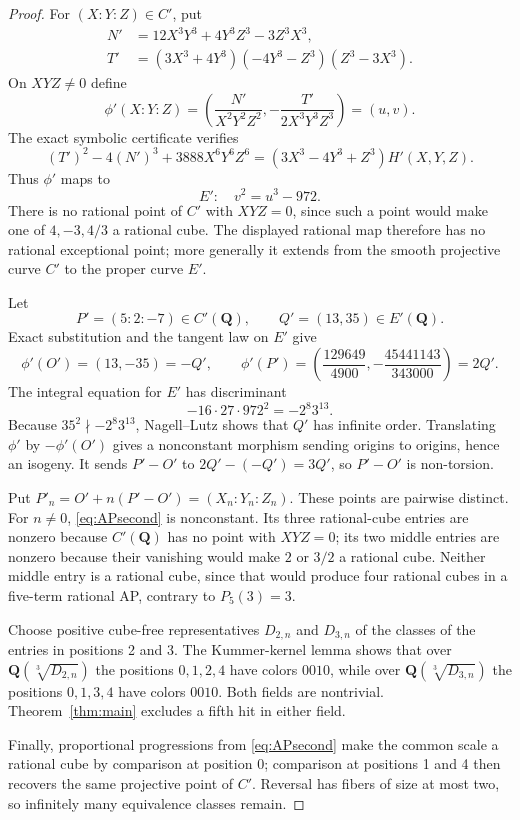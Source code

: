 \documentclass[10pt]{article}
\newcommand{\Q}{\mathbf Q}
\begin{document}
\begin{proof}
For $(X:Y:Z)\in C'$, put
\[
\begin{aligned}
 N'&=12X^3Y^3+4Y^3Z^3-3Z^3X^3,\\
 T'&=(3X^3+4Y^3)(-4Y^3-Z^3)(Z^3-3X^3).
\end{aligned}
\]
On $XYZ\ne0$ define
\[
 \phi'(X:Y:Z)=
 \left(\frac{N'}{X^2Y^2Z^2},
       -\frac{T'}{2X^3Y^3Z^3}\right)=(u,v).
\]
The exact symbolic certificate verifies
\[
 (T')^2-4(N')^3+3888X^6Y^6Z^6
 =(3X^3-4Y^3+Z^3)H'(X,Y,Z).
\]
Thus $\phi'$ maps to
\[
 E':\quad v^2=u^3-972.
\]
There is no rational point of $C'$ with $XYZ=0$, since such a point would
make one of $4,-3,4/3$ a rational cube.  The displayed rational map therefore
has no rational exceptional point; more generally it extends from the smooth
projective curve $C'$ to the proper curve $E'$.

Let
\[
 P'=(5:2:-7)\in C'(\Q),\qquad Q'=(13,35)\in E'(\Q).
\]
Exact substitution and the tangent law on $E'$ give
\[
 \phi'(O')=(13,-35)=-Q',\qquad
 \phi'(P')=
 \left(\frac{129649}{4900},-\frac{45441143}{343000}\right)=2Q'.
\]
The integral equation for $E'$ has discriminant
\[
 -16\cdot27\cdot972^2=-2^8 3^{13}.
\]
Because $35^2\nmid -2^8 3^{13}$, Nagell--Lutz shows that $Q'$ has infinite
order.  Translating $\phi'$ by $-\phi'(O')$ gives a nonconstant morphism
sending origins to origins, hence an isogeny.  It sends $P'-O'$ to
$2Q'-(-Q')=3Q'$, so $P'-O'$ is non-torsion.

Put $P'_n=O'+n(P'-O')=(X_n:Y_n:Z_n)$.  These points are pairwise distinct.
For $n\ne0$, \eqref{eq:APsecond} is nonconstant.  Its three rational-cube
entries are nonzero because $C'(\Q)$ has no point with $XYZ=0$; its two
middle entries are nonzero because their vanishing would make $2$ or $3/2$
a rational cube.  Neither middle entry is a rational cube, since that would
produce four rational cubes in a five-term rational AP, contrary to
$P_5(3)=3$.

Choose positive cube-free representatives $D_{2,n}$ and $D_{3,n}$ of the
classes of the entries in positions 2 and 3.  The Kummer-kernel lemma shows
that over $\Q(\sqrt[3]{D_{2,n}})$ the positions $0,1,2,4$ have colors
$0010$, while over $\Q(\sqrt[3]{D_{3,n}})$ the positions $0,1,3,4$ have
colors $0010$.  Both fields are nontrivial.  Theorem~\ref{thm:main} excludes
a fifth hit in either field.

Finally, proportional progressions from \eqref{eq:APsecond} make the common
scale a rational cube by comparison at position 0; comparison at positions
1 and 4 then recovers the same projective point of $C'$.  Reversal has fibers
of size at most two, so infinitely many equivalence classes remain.
\end{proof}
\end{document}
